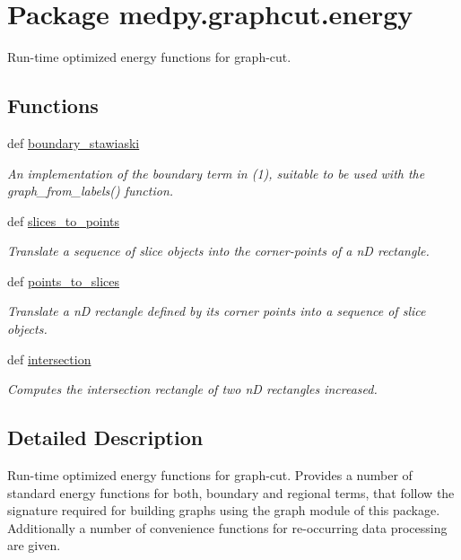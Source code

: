 \hypertarget{namespacemedpy_1_1graphcut_1_1energy}{
\section{Package medpy.graphcut.energy}
\label{namespacemedpy_1_1graphcut_1_1energy}
}


Run-\/time optimized energy functions for graph-\/cut.  


\subsection*{Functions}
\begin{DoxyCompactItemize}
\item 
def \hyperlink{namespacemedpy_1_1graphcut_1_1energy_a2bf88e97c3a4d86bfa293ead5bdefb33}{boundary\_\-stawiaski}
\begin{DoxyCompactList}\small\item\em An implementation of the boundary term in (1), suitable to be used with the  graph\_\-from\_\-labels() function. \end{DoxyCompactList}\item 
def \hyperlink{namespacemedpy_1_1graphcut_1_1energy_a53cb6ebef205639a0465db7630ea669a}{slices\_\-to\_\-points}
\begin{DoxyCompactList}\small\item\em Translate a sequence of slice objects into the corner-\/points of a nD rectangle. \end{DoxyCompactList}\item 
def \hyperlink{namespacemedpy_1_1graphcut_1_1energy_a15e31b09496557c3993b3bffaf272c9c}{points\_\-to\_\-slices}
\begin{DoxyCompactList}\small\item\em Translate a nD rectangle defined by its corner points into a sequence of slice objects. \end{DoxyCompactList}\item 
def \hyperlink{namespacemedpy_1_1graphcut_1_1energy_a6366d423b18ab03571da7ff44e634c2f}{intersection}
\begin{DoxyCompactList}\small\item\em Computes the intersection rectangle of two nD rectangles increased. \end{DoxyCompactList}\end{DoxyCompactItemize}


\subsection{Detailed Description}
Run-\/time optimized energy functions for graph-\/cut. Provides a number of standard energy functions for both, boundary and regional terms, that follow the signature required for building graphs using the graph module of this package. Additionally a number of convenience functions for re-\/occurring data processing are given.

